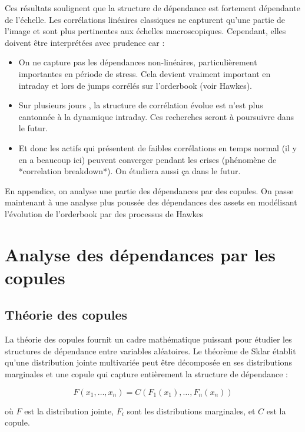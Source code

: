 \documentclass[10pt,a4paper]{article}
\theoremstyle{definition}
\theoremstyle{remark}
\begin{document}
\begin{itemize}
Ces résultats soulignent que la structure de dépendance est fortement dépendante de l'échelle. Les corrélations linéaires classiques ne capturent qu'une partie de l'image et sont plus pertinentes aux échelles macroscopiques. Cependant, elles doivent être interprétées avec prudence car :
\begin{itemize}
    \item On ne capture pas les dépendances non-linéaires, particulièrement importantes en période de stress. Cela devient vraiment important en intraday et lors de jumps corrélés sur l'orderbook (voir Hawkes).
    \item Sur plusieurs jours , la structure de corrélation évolue est n'est plus cantonnée à la dynamique intraday. Ces recherches seront à poursuivre dans le futur.
    \item Et donc les actifs qui présentent de faibles corrélations en temps normal (il y en a beaucoup ici) peuvent converger pendant les crises (phénomène de *correlation breakdown*). On étudiera aussi ça dans le futur.
\end{itemize}

En appendice, on analyse une partie des dépendances par des copules. On passe maintenant à une analyse plus poussée des dépendances des assets en modélisant l'évolution de l'orderbook par des processus de Hawkes

\newpage
\section{Analyse des dépendances par les copules}

\subsection{Théorie des copules}

La théorie des copules fournit un cadre mathématique puissant pour étudier les structures de dépendance entre variables aléatoires. Le théorème de Sklar établit qu'une distribution jointe multivariée peut être décomposée en ses distributions marginales et une copule qui capture entièrement la structure de dépendance :

\begin{equation}
F(x_1, \ldots, x_n) = C(F_1(x_1), \ldots, F_n(x_n))
\end{equation}

où $F$ est la distribution jointe, $F_i$ sont les distributions marginales, et $C$ est la copule.


\end{itemize}
\end{document}

